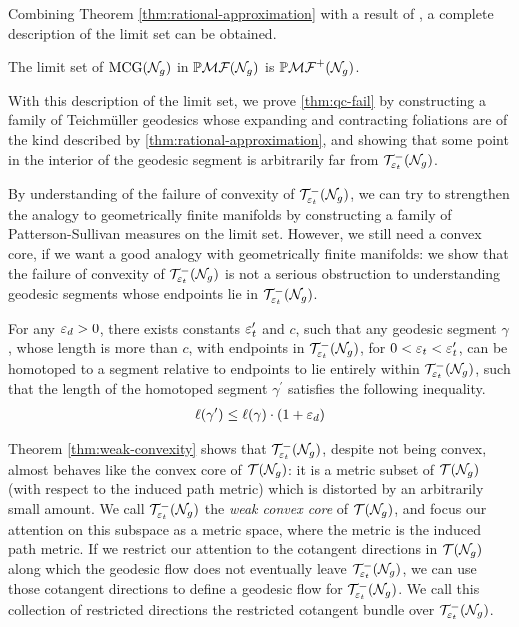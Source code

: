 Combining Theorem \ref{thm:rational-approximation} with a result of \textcite[Proposition 1]{lenzhen2010criteria}, a complete description of the limit set can be obtained.
\begin{theorem}
  The limit set of $\mathrm{MCG}(\mathcal{N}_g)$ in $\mathbb{P}\mathcal{MF}(\mathcal{N}_g)$ is $\mathbb{P}\mathcal{MF}^+(\mathcal{N}_g)$.
\end{theorem}

With this description of the limit set, we prove \autoref{thm:qc-fail} by constructing a family of Teichmüller geodesics whose expanding and contracting foliations are of the kind described by \autoref{thm:rational-approximation}, and showing that some point in the interior of the geodesic segment is arbitrarily far from $\mathcal{T}_{\varepsilon_t}^{-}(\mathcal{N}_g)$.

By understanding of the failure of convexity of $\mathcal{T}_{\varepsilon_t}^{-}(\mathcal{N}_g)$, we can try to strengthen the analogy to geometrically finite manifolds by constructing a family of Patterson-Sullivan measures on the limit set.
However, we still need a convex core, if we want a good analogy with geometrically finite manifolds: we show that the failure of convexity of $\mathcal{T}_{\varepsilon_t}^{-}(\mathcal{N}_g)$ is not a serious obstruction to understanding geodesic segments whose endpoints lie in $\mathcal{T}_{\varepsilon_t}^{-}(\mathcal{N}_g)$.


\begingroup
\def\thetheorem{\ref{thm:weak-convexity}}
\begin{theorem}
For any $\varepsilon_d > 0$, there exists constants $\varepsilon_t^{\prime}$ and $c$, such that any geodesic segment $\gamma$, whose length is more than $c$, with endpoints in $\mathcal{T}_{\varepsilon_t}^{-}(\mathcal{N}_g)$, for $0 < \varepsilon_t < \varepsilon_t^{\prime}$, can be homotoped to a segment relative to endpoints to lie entirely within $\mathcal{T}_{\varepsilon_t}^{-}(\mathcal{N}_g)$, such that the length of the homotoped segment $\gamma^{\prime}$ satisfies the following inequality.
  \begin{align*}
    \ell(\gamma^{\prime}) \leq \ell(\gamma) \cdot (1 + \varepsilon_d)
  \end{align*}
\end{theorem}
\addtocounter{theorem}{-1}
\endgroup

Theorem \ref{thm:weak-convexity} shows that $\mathcal{T}_{\varepsilon_t}^{-}(\mathcal{N}_g)$, despite not being convex, almost behaves like the convex core of $\mathcal{T}(\mathcal{N}_g)$: it is a metric subset of $\mathcal{T}(\mathcal{N}_g)$ (with respect to the induced path metric) which is distorted by an arbitrarily small amount.
We call $\mathcal{T}_{\varepsilon_t}^{-}(\mathcal{N}_g)$ the \emph{weak convex core} of $\mathcal{T}(\mathcal{N}_g)$, and focus our attention on this subspace as a metric space, where the metric is the induced path metric.
If we restrict our attention to the cotangent directions in $\mathcal{T}(\mathcal{N}_g)$ along which the geodesic flow does not eventually leave $\mathcal{T}_{\varepsilon_t}^{-}(\mathcal{N}_g)$, we can use those cotangent directions to define a geodesic flow for $\mathcal{T}_{\varepsilon_t}^{-}(\mathcal{N}_g)$.
We call this collection of restricted directions the restricted cotangent bundle over $\mathcal{T}_{\varepsilon_t}^{-}(\mathcal{N}_g)$.

